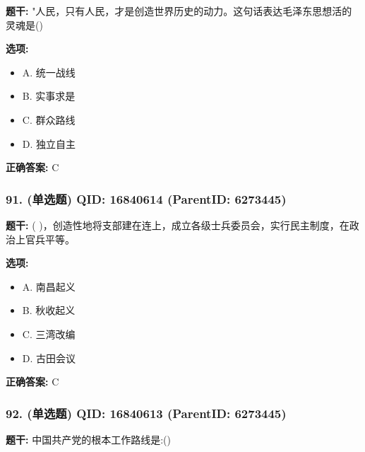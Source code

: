 \documentclass[12pt,UTF8]{ctexart}
\begin{document}
\textbf{题干:}
"人民，只有人民，才是创造世界历史的动力。这句话表达毛泽东思想活的灵魂是()



\textbf{选项:}
\begin{itemize}[leftmargin=*]

  \item A. 统一战线

  \item B. 实事求是

  \item C. 群众路线

  \item D. 独立自主

\end{itemize}

\textbf{正确答案:}
C

\vspace{0.3em}\hrulefill\vspace{0.7em}

\subsubsection*{91. (单选题) \small QID: 16840614 (ParentID: 6273445)}

\textbf{题干:}
( )，创造性地将支部建在连上，成立各级士兵委员会，实行民主制度，在政治上官兵平等。



\textbf{选项:}
\begin{itemize}[leftmargin=*]

  \item A. 南昌起义

  \item B. 秋收起义

  \item C. 三湾改编

  \item D. 古田会议

\end{itemize}

\textbf{正确答案:}
C

\vspace{0.3em}\hrulefill\vspace{0.7em}

\subsubsection*{92. (单选题) \small QID: 16840613 (ParentID: 6273445)}

\textbf{题干:}
中国共产党的根本工作路线是:()
\end{document}
